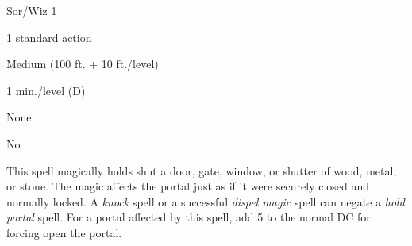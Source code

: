 
\begin{description*}
\item[Level:] Sor/Wiz 1
\item[Casting Time:] 1 standard action
\item[Range:] Medium (100 ft. + 10 ft./level)
\item[Duration:] 1 min./level (D)
\item[Saving Throw:] None
\item[Spell Resistance:] No
\end{description*}

This spell magically holds shut a door, gate, window, or shutter of wood, metal,
or stone. The magic affects the portal just as if it were securely closed and normally
locked. A \textit{knock} spell or a successful \textit{dispel magic} spell can
negate a \textit{hold portal} spell.
For a portal affected by this spell, add 5 to the normal DC for forcing open the
portal.